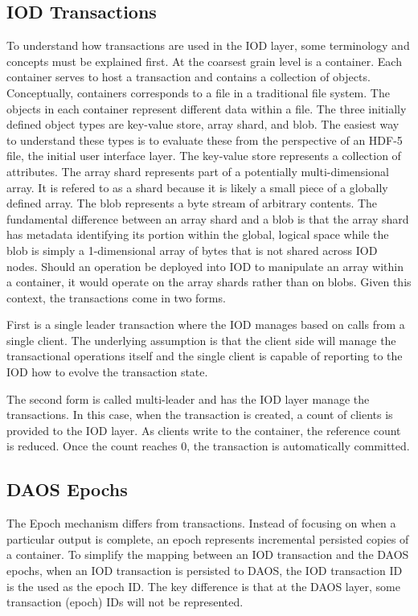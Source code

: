 \documentclass[conference]{sig-alt-gov2}
\begin{document}
\subsection{IOD Transactions}
To understand how transactions are used in the IOD layer, some terminology and
concepts must be explained first. At the coarsest grain level is a container.
Each container serves to host a transaction and contains a collection of
objects. Conceptually, containers corresponds to a file in a traditional file
system. The objects in each container represent different data within a file.
The three initially defined object types are key-value store, array shard,
and blob. The easiest way to understand these types is to evaluate these from
the perspective of an HDF-5 file, the initial user interface layer. The
key-value store represents a collection of attributes. The array shard
represents part of a potentially multi-dimensional array. It is refered to as a
shard because it is likely a small piece of a globally defined array. The blob
represents a byte stream of arbitrary contents.  The fundamental difference
between an array shard and a blob is that the array shard has metadata
identifying its portion within the global, logical space while the blob is
simply a 1-dimensional array of bytes that is not shared across IOD nodes.
Should an operation be deployed into IOD to manipulate an array within a
container, it would operate on the array shards rather than on blobs. Given
this context, the transactions come in two forms.

First is a single leader transaction where the IOD manages based on calls from
a single client. The underlying assumption is that the client side will manage
the transactional operations itself and the single client is capable of
reporting to the IOD how to evolve the transaction state. 

The second form is called multi-leader and has the IOD layer manage the
transactions. In this case, when the transaction is created, a count of clients
is provided to the IOD layer. As clients write to the container, the reference
count is reduced. Once the count reaches 0, the transaction is automatically
committed.

\subsection{DAOS Epochs}
The Epoch mechanism differs from transactions. Instead of focusing on when a
particular output is complete, an epoch represents incremental persisted copies
of a container. To simplify the mapping between an IOD transaction and the DAOS
epochs, when an IOD transaction is persisted to DAOS, the IOD transaction ID is
the used as the epoch ID. The key difference is that at the DAOS layer, some
transaction (epoch) IDs will not be represented.
\end{document}
